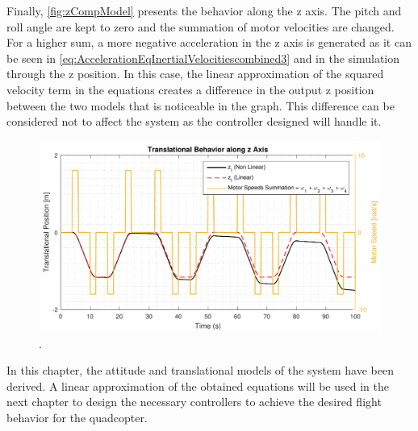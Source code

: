 Finally, \autoref{fig:zCompModel} presents the behavior along the z axis. The pitch and roll angle are kept to zero and the summation of motor velocities are changed. For a higher sum, a more negative acceleration in the z axis is generated as it can be seen in \autoref{eq:AccelerationEqInertialVelocitiescombined3} and in the simulation through the z position. In this case, the linear approximation of the squared velocity term in the equations creates a difference in the output z position between the two models that is noticeable in the graph. This difference can be considered not to affect the system as the controller designed will handle it.  
\begin{figure}[H]
	\centering
	\includegraphics[scale=0.65]{figures/zCompModel}
	\caption{.}
	\label{fig:zCompModel}
\end{figure}

In this chapter, the attitude and translational models of the system have been derived. A linear approximation of the obtained equations will be used in the next chapter to design the necessary controllers to achieve the desired flight behavior for the quadcopter.




